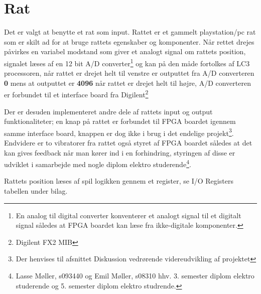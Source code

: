 \section{Rat}
Det er valgt at benytte et rat som input. Rattet er et gammelt playstation/pc rat som er skilt ad for at bruge rattets egenskaber og komponenter. Når rettet drejes påvirkes en variabel modstand som giver et analogt signal om rattets position, signalet læses af en 12 bit A/D converter\footnote{En analog til digital converter konventerer et analogt signal til et digitalt signal således at FPGA boardet kan læse fra ikke-digitale komponenter.} og kan på den måde fortolkes af LC3 processoren, når rattet er drejet helt til venstre er outputtet fra A/D converteren \textbf{0} mens at outputtet er \textbf{4096} når rattet er drejet helt til højre, A/D converteren er forbundet til et interface board fra Digilent\textregistered\footnote{Digilent FX2 MIB}

Der er desuden implementeret andre dele af rattets input og output funktionaliteter; en knap på rattet er forbundet til FPGA boardet igennem samme interface board, knappen er dog ikke i brug i det endelige projekt\footnote{Der henvises til afsnittet Diskussion vedrørende videreudvikling af projektet}. Endvidere er to vibratorer fra rattet også styret af FPGA boardet således at det kan gives feedback når man kører ind i en forhindring, styringen af disse er udviklet i samarbejde med nogle diplom elektro studerende\footnote{Lasse Møller, s093440 og Emil Møller, s08310 hhv. 3. semester diplom elektro studerende og 5. semester diplom elektro studrende.}.

Rattets position læses af spil logikken gennem et register, se I/O Registers tabellen under bilag.